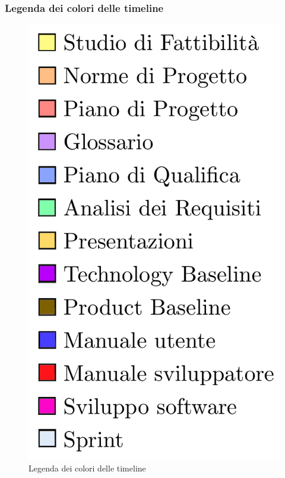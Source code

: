 \subsubsection{Legenda dei colori delle timeline}
\begin{figure}[H]
	\centering
    \includegraphics[scale = 0.5]{components/img/legenda.png}
    \caption{Legenda dei colori delle timeline}
    \label{fig:Legenda dei colori delle timeline}
\end{figure}

